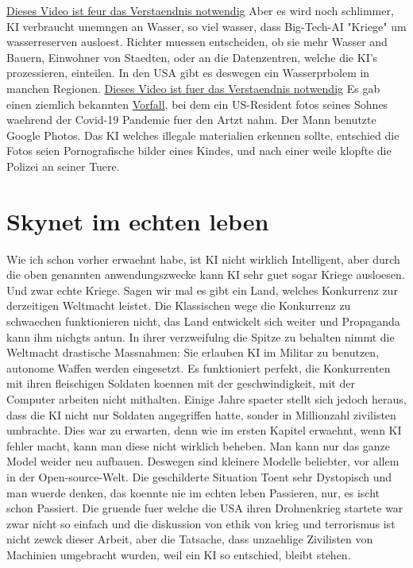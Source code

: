 \documentclass{report}
\begin{document}
\newline
\hyperlink{https://youtube.com/watch?v=5NUD7rdbCm8}{Dieses Video ist feur das Verstaendnis notwendig}
\newline
\newline
Aber es wird noch schlimmer, KI verbraucht unemngen an Wasser, so viel wasser, dass Big-Tech-AI "Kriege" um wasserreserven ausloest. Richter muessen entscheiden, ob sie mehr Wasser and Bauern, Einwohner von Staedten, oder an die Datenzentren, welche die KI's prozessieren, einteilen.
In den USA gibt es deswegen ein Wasserprbolem in manchen Regionen. 
\newline
\hyperlink{https://youtube.com/watch?v=F-6la_I-xkQ}{Dieses Video ist fuer das Verstaendnis notwendig}
\newline
\newline
Es gab einen ziemlich bekannten \hyperlink{https://www.nytimes.com/2022/08/21/technology/google-surveillance-toddler-photo.html}{Vorfall}, bei dem ein US-Resident fotos seines Sohnes waehrend der Covid-19 Pandemie fuer den Artzt nahm. Der Mann benutzte Google Photos. Das KI welches illegale materialien erkennen sollte, entschied die Fotos seien Pornografische bilder eines Kindes, und nach einer weile klopfte die Polizei an seiner Tuere.

\section{Skynet im echten leben}
Wie ich schon vorher erwaehnt habe, ist KI nicht wirklich Intelligent, aber durch die oben genannten anwendungszwecke kann KI sehr guet sogar Kriege ausloesen. Und zwar echte Kriege.
\newline
Sagen wir mal es gibt ein Land, welches Konkurrenz zur derzeitigen Weltmacht leistet. Die Klassischen wege die Konkurrenz zu schwaechen funktionieren nicht, das Land entwickelt sich weiter und Propaganda kann ihm nichgts antun. In ihrer verzweifulng die Spitze zu behalten nimmt die Weltmacht drastische Massnahmen: Sie erlauben KI im Militar zu benutzen, autonome Waffen werden eingesetzt. Es funktioniert perfekt, die Konkurrenten mit ihren fleischigen Soldaten koennen mit der geschwindigkeit, mit der Computer arbeiten nicht mithalten. Einige Jahre spaeter stellt sich jedoch heraus, dass die KI nicht nur Soldaten angegriffen hatte, sonder in Millionzahl zivilisten umbrachte. Dies war zu erwarten, denn wie im ersten Kapitel erwaehnt, wenn KI fehler macht, kann man diese nicht wirklich beheben. Man kann nur das ganze Model weider neu aufbauen. Deswegen sind kleinere Modelle beliebter, vor allem in der Open-source-Welt.
\newline
\newline
Die geschilderte Situation Toent sehr Dystopisch und man wuerde denken, das koennte nie im echten leben Passieren, nur, es ischt schon Passiert. Die gruende fuer welche die USA ihren Drohnenkrieg startete war zwar nicht so einfach und die diskussion von ethik von krieg und terrorismus ist nicht zewck dieser Arbeit, aber die Tatsache, dass unzaehlige Zivilisten von Machinien umgebracht wurden, weil ein KI so entschied, bleibt stehen.
\printbibliography
\end{document}
